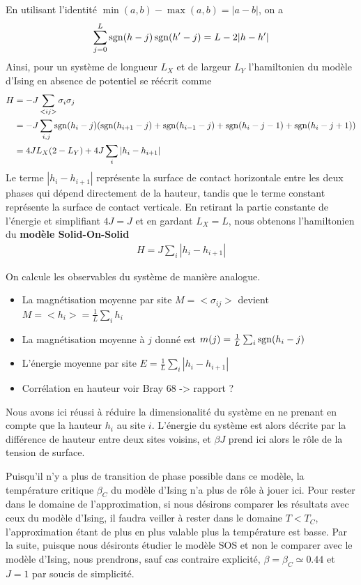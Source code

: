 En utilisant l'identité $\min(a,b)-\max(a,b)=|a-b|$, on a
\begin{align*}
    \sum_{j=0}^L \operatorname{sgn}(h-j)\operatorname{sgn}(h'-j) = L - 2 |h-h'|
\end{align*}
Ainsi, pour un système de longueur $L_X$ et de largeur $L_Y$ l'hamiltonien du modèle d'Ising en absence de potentiel se réécrit comme 
\begin{align*}
    H &= - J \sum_{<ij>} \sigma_i \sigma_j  \nonumber \\
    &= -J \sum_{i,j} \operatorname{sgn}(h_i-j) ( \operatorname{sgn}(h_{i+1}-j)+\operatorname{sgn}(h_{i-1}-j)+\operatorname{sgn}(h_{i}-j-1)+\operatorname{sgn}(h_{i}-j+1) ) \nonumber \\
    &= 4 J L_X (2-L_Y) +4J \sum_i |h_i-h_{i+1}|
\end{align*}
Le terme $|h_i-h_{i+1}|$ représente la surface de contact horizontale entre les deux phases qui dépend directement de la hauteur, tandis que le terme constant représente la surface de contact verticale.
En retirant la partie constante de l'énergie et simplifiant $4 J = J$ et en gardant $L_X = L$, nous obtenons l'hamiltonien du \textbf{modèle Solid-On-Solid}
\begin{align}
    H = J \sum_i |h_i-h_{i+1}|
    \label{hamil-sos}
\end{align}

On calcule les observables du système de manière analogue. 

\begin{itemize}
	\item La magnétisation moyenne par site $M = <\sigma_{ij}>$ devient $M = <h_i> = \frac{1}{L}\sum_i h_i$
	\item La magnétisation moyenne à $j$ donné est $m(j) = \frac{1}{L} \sum_i \operatorname{sgn}(h_i-j)$
	\item L'énergie moyenne par site $E = \frac{1}{L}  \sum_i |h_i-h_{i+1}|$
	\item Corrélation en hauteur voir Bray 68 -> rapport ?
\end{itemize}

Nous avons ici réussi à réduire la dimensionalité du système en ne prenant en compte que la hauteur $h_i$ au site $i$. L'énergie du système est alors décrite par la différence de hauteur entre deux sites voisins, et $\beta J$ prend ici alors le rôle de la tension de surface.

Puisqu'il n'y a plus de transition de phase possible dans ce modèle, la température critique $\beta_C$ du modèle d'Ising n'a plus de rôle à jouer ici. Pour rester dans le domaine de l'approximation, si nous désirons comparer les résultats avec ceux du modèle d'Ising, il faudra veiller à rester dans le domaine $T \less T_C$, l'approximation étant de plus en plus valable plus la température est basse. Par la suite, puisque nous désironts étudier le modèle SOS et non le comparer avec le modèle d'Ising, nous prendrons, sauf cas contraire explicité, $\beta = \beta_C \simeq 0.44$ et $J=1$ par soucis de simplicité. 

